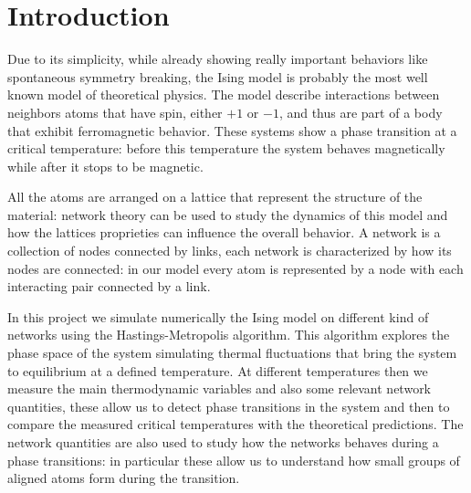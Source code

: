 \section{Introduction}
Due to its simplicity, while already showing really important behaviors like spontaneous symmetry breaking, the Ising model is probably the most well known model of theoretical physics. The model describe interactions between neighbors atoms that have spin, either $+1$ or $-1$, and thus are part of a body that exhibit ferromagnetic behavior. These systems show a phase transition at a critical temperature: before this temperature the system behaves magnetically while after it stops to be magnetic. 

All the atoms are arranged on a lattice that represent the structure of the material: network theory can be used to study the dynamics of this model and how the lattices proprieties can influence the overall behavior. A network is a collection of nodes connected by links, each network is characterized by how its nodes are connected: in our model every atom is represented by a node with each interacting pair connected by a link. 

In this project we simulate numerically the Ising model on different kind of networks using the Hastings-Metropolis algorithm. This algorithm explores the phase space of the system simulating thermal fluctuations that bring the system to equilibrium at a defined temperature. At different temperatures then we measure the main thermodynamic variables and also some relevant network quantities, these allow us to detect phase transitions in the system and then to compare the measured critical temperatures with the theoretical predictions. The network quantities are also used to study how the networks behaves during a phase transitions: in particular these allow us to understand how small groups of aligned atoms form during the transition. 


